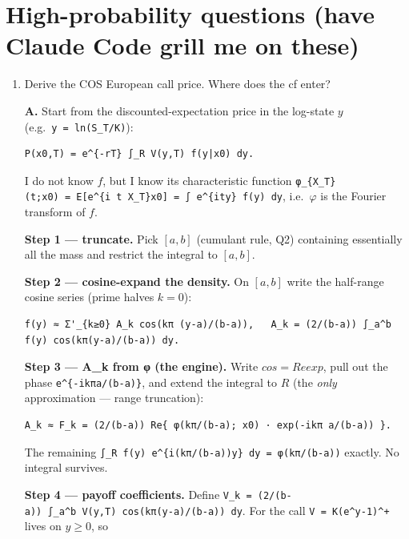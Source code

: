 \documentclass[
  11pt,
]{article}
\begin{document}
\hypertarget{high-probability-questions-have-claude-code-grill-me-on-these}{%
\section{High-probability questions (have Claude Code grill me on
these)}\label{high-probability-questions-have-claude-code-grill-me-on-these}}

\begin{enumerate}
\def\labelenumi{\arabic{enumi}.}
\item
  Derive the COS European call price. Where does the cf enter?

  \textbf{A.} Start from the discounted-expectation price in the
  log-state \(y\) (e.g.~\texttt{y\ =\ ln(S\_T/K)}):

\begin{verbatim}
P(x0,T) = e^{-rT} ∫_R V(y,T) f(y|x0) dy.
\end{verbatim}

  I do not know \(f\), but I know its characteristic function
  \texttt{φ\_\{X\_T\}(t;x0)\ =\ E{[}e\^{}\{i\ t\ X\_T\}\textbar{}x0{]}\ =\ ∫\ e\^{}\{ity\}\ f(y)\ dy},
  i.e.~\(φ\) is the Fourier transform of \(f\).

  \textbf{Step 1 --- truncate.} Pick \([a,b]\) (cumulant rule, Q2)
  containing essentially all the mass and restrict the integral to
  \([a,b]\).

  \textbf{Step 2 --- cosine-expand the density.} On \([a,b]\) write the
  half-range cosine series (prime halves \(k=0\)):

\begin{verbatim}
f(y) ≈ Σ'_{k≥0} A_k cos(kπ (y-a)/(b-a)),   A_k = (2/(b-a)) ∫_a^b f(y) cos(kπ(y-a)/(b-a)) dy.
\end{verbatim}

  \textbf{Step 3 --- A\_k from φ (the engine).} Write \(cos = Re{exp}\),
  pull out the phase \texttt{e\^{}\{-ikπa/(b-a)\}}, and extend the
  integral to \(R\) (the \emph{only} approximation --- range
  truncation):

\begin{verbatim}
A_k ≈ F_k = (2/(b-a)) Re{ φ(kπ/(b-a); x0) · exp(-ikπ a/(b-a)) }.
\end{verbatim}

  The remaining
  \texttt{∫\_R\ f(y)\ e\^{}\{i(kπ/(b-a))y\}\ dy\ =\ φ(kπ/(b-a))}
  exactly. No integral survives.

  \textbf{Step 4 --- payoff coefficients.} Define
  \texttt{V\_k\ =\ (2/(b-a))\ ∫\_a\^{}b\ V(y,T)\ cos(kπ(y-a)/(b-a))\ dy}.
  For the call \texttt{V\ =\ K(e\^{}y-1)\^{}+} lives on \(y≥0\), so


\end{enumerate}
\end{document}
